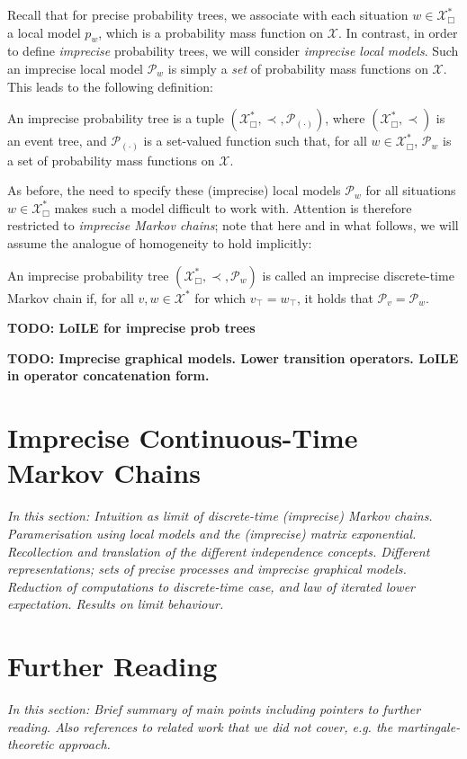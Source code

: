 \documentclass[graybox]{svmult}
\newcommand{\states}{\mathcal{X}}
\begin{document}
Recall that for precise probability trees, we associate with each situation $w\in\states^*_\Box$ a local model $p_w$, which is a probability mass function on $\states$. In contrast, in order to define \emph{imprecise} probability trees, we will consider \emph{imprecise local models}. Such an imprecise local model $\mathcal{P}_w$ is simply a \emph{set} of probability mass functions on $\states$. This leads to the following definition:
\begin{definition}
An imprecise probability tree is a tuple $(\states^*_\Box,\prec,\mathcal{P}_{(\cdot)})$, where $(\states^*_\Box,\prec)$ is an event tree, and $\mathcal{P}_{(\cdot)}$ is a set-valued function such that, for all $w\in\states^*_\Box$, $\mathcal{P}_w$ is a set of probability mass functions on $\states$.
\end{definition}
As before, the need to specify these (imprecise) local models $\mathcal{P}_w$ for all situations $w\in\states^*_\Box$ makes such a model difficult to work with. Attention is therefore restricted to \emph{imprecise Markov chains}; note that here and in what follows, we will assume the analogue of homogeneity to hold implicitly:
\begin{definition}An imprecise probability tree $(\states^*_\Box,\prec,\mathcal{P}_w)$ is called an imprecise discrete-time Markov chain if, for all $v,w\in\states^*$ for which $v_\top=w_\top$, it holds that $\mathcal{P}_v=\mathcal{P}_w$.
\end{definition}

{\bf TODO: LoILE for imprecise prob trees}

{\bf TODO: Imprecise graphical models. Lower transition operators. LoILE in operator concatenation form. }

\section{Imprecise Continuous-Time Markov Chains}

\emph{In this section: Intuition as limit of discrete-time (imprecise) Markov chains. Paramerisation using local models and the (imprecise) matrix exponential. Recollection and translation of the different independence concepts. Different representations; sets of precise processes and imprecise graphical models. Reduction of computations to discrete-time case, and law of iterated lower expectation. Results on limit behaviour.}

\section{Further Reading}

\emph{In this section: Brief summary of main points including pointers to further reading. Also references to related work that we did not cover, e.g. the martingale-theoretic approach.}
\end{document}
